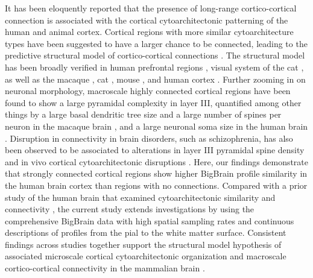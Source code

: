 \begin{refsection}
It has been eloquently reported that the presence of long-range cortico-cortical connection is associated with the cortical cytoarchitectonic patterning of the human and animal cortex. Cortical regions with more similar cytoarchitecture types have been suggested to have a larger chance to be connected, leading to the predictive structural model of cortico-cortical connections \citep{barbas2015general}. The structural model has been broadly verified in human prefrontal regions \citep{Barbas2005ParallelOO}, visual system of the cat \citep{Hilgetag2010CytoarchitecturalDA}, as well as the macaque \citep{beul2017predictive}, cat \citep{beul2015predictive}, mouse \citep{goulas2017principles}, and human cortex \citep{goulas2016cytoarchitectonic}. Further zooming in on neuronal morphology, macroscale highly connected cortical regions have been found to show a large pyramidal complexity in layer III, quantified among other things by a large basal dendritic tree size and a large number of spines per neuron in the macaque brain \citep{scholtens2014linking}, and a large neuronal soma size in the human brain \citep{van2015bridging}. Disruption in connectivity in brain disorders, such as schizophrenia, has also been observed to be associated to alterations in layer III pyramidal spine density \citep{VANDENHEUVEL2016293} and in vivo cortical cytoarchitectonic disruptions \citep{Wei2018CorticalMT}. Here, our findings demonstrate that strongly connected cortical regions show higher BigBrain profile similarity in the human brain cortex than regions with no connections. Compared with a prior study of the human brain that examined cytoarchitectonic similarity and connectivity \citep{goulas2016cytoarchitectonic}, the current study extends investigations by using the comprehensive BigBrain data with high spatial sampling rates and continuous descriptions of profiles from the pial to the white matter surface. Consistent findings across studies together support the structural model hypothesis of associated microscale cortical cytoarchitectonic organization and macroscale cortico-cortical connectivity in the mammalian brain \citep{barbas2015general,Barbas2005ParallelOO,beul2017predictive,beul2015predictive,goulas2016cytoarchitectonic,goulas2017principles,Hilgetag2010CytoarchitecturalDA}.


\end{refsection}
